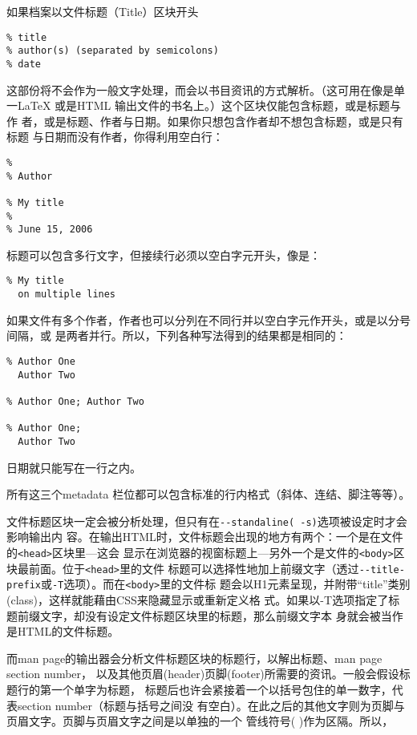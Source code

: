 \documentclass[fancyhdr,bookmark]{ctexbook}
\begin{document}
如果档案以文件标题（Title）区块开头

\begin{lstlisting}
% title
% author(s) (separated by semicolons)
% date
\end{lstlisting}

这部份将不会作为一般文字处理，而会以书目资讯的方式解析。（这可用在像是单
一LaTeX 或是HTML 输出文件的书名上。）这个区块仅能包含标题，或是标题与作
者，或是标题、作者与日期。如果你只想包含作者却不想包含标题，或是只有标题
与日期而没有作者，你得利用空白行：

\begin{lstlisting}
%
% Author

% My title
%
% June 15, 2006
\end{lstlisting}

标题可以包含多行文字，但接续行必须以空白字元开头，像是：

\begin{lstlisting}
% My title
  on multiple lines
\end{lstlisting}

如果文件有多个作者，作者也可以分列在不同行并以空白字元作开头，或是以分号间隔，或
是两者并行。所以，下列各种写法得到的结果都是相同的：

\begin{lstlisting}
% Author One
  Author Two

% Author One; Author Two

% Author One;
  Author Two
\end{lstlisting}

日期就只能写在一行之内。

所有这三个metadata
栏位都可以包含标准的行内格式（斜体、连结、脚注等等）。

文件标题区块一定会被分析处理，但只有在\lstinline!--standaline( -s)!选项被设定时才会影响输出内
容。在输出HTML时，文件标题会出现的地方有两个：一个是在文件的\lstinline!<head>!区块里---这会
显示在浏览器的视窗标题上---另外一个是文件的\lstinline!<body>!区块最前面。位于\lstinline!<head>!里的文件
标题可以选择性地加上前缀文字（透过\lstinline!--title-prefix!或\lstinline!-T!选项）。而在\lstinline!<body>!里的文件标
题会以H1元素呈现，并附带``title''类别(class)，这样就能藉由CSS来隐藏显示或重新定义格
式。如果以-T选项指定了标题前缀文字，却没有设定文件标题区块里的标题，那么前缀文字本
身就会被当作是HTML的文件标题。

而man page的输出器会分析文件标题区块的标题行，以解出标题、man page
section number，
以及其他页眉(header)页脚(footer)所需要的资讯。一般会假设标题行的第一个单字为标题，
标题后也许会紧接着一个以括号包住的单一数字，代表section
number（标题与括号之间没
有空白）。在此之后的其他文字则为页脚与页眉文字。页脚与页眉文字之间是以单独的一个
管线符号( \textbar{})作为区隔。所以，
\end{document}
